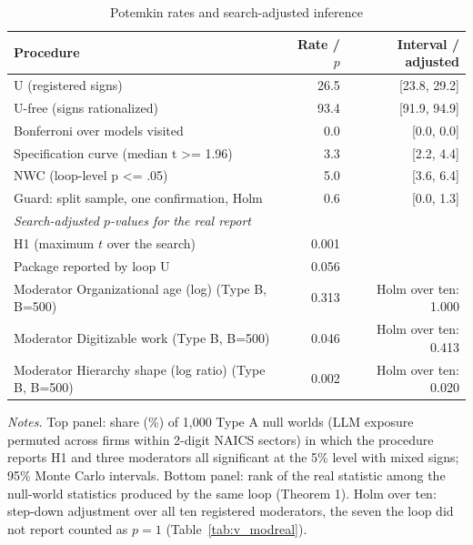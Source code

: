 \begin{table}[!htbp]\centering\footnotesize
\caption{Potemkin rates and search-adjusted inference}\label{tab:procedures}
\begin{tabular}{lrr}
\toprule
Procedure & Rate / $p$ & Interval / adjusted \\
\midrule
U (registered signs) & 26.5 & [23.8, 29.2] \\
U-free (signs rationalized) & 93.4 & [91.9, 94.9] \\
Bonferroni over models visited & 0.0 & [0.0, 0.0] \\
Specification curve (median t >= 1.96) & 3.3 & [2.2, 4.4] \\
NWC (loop-level p <= .05) & 5.0 & [3.6, 6.4] \\
Guard: split sample, one confirmation, Holm & 0.6 & [0.0, 1.3] \\
\midrule \multicolumn{3}{l}{\textit{Search-adjusted $p$-values for the real report}} \\
H1 (maximum $t$ over the search) & 0.001 &  \\
Package reported by loop U & 0.056 &  \\
Moderator Organizational age (log) (Type B, B=500) & 0.313 & Holm over ten: 1.000 \\
Moderator Digitizable work (Type B, B=500) & 0.046 & Holm over ten: 0.413 \\
Moderator Hierarchy shape (log ratio) (Type B, B=500) & 0.002 & Holm over ten: 0.020 \\
\bottomrule
\end{tabular}
\begin{minipage}{0.95\linewidth}\vspace{2pt}\scriptsize\textit{Notes.} Top panel: share (\%) of 1,000 Type A null worlds (LLM exposure permuted across firms within 2-digit NAICS sectors) in which the procedure reports H1 and three moderators all significant at the 5\% level with mixed signs; 95\% Monte Carlo intervals. Bottom panel: rank of the real statistic among the null-world statistics produced by the same loop (Theorem 1). Holm over ten: step-down adjustment over all ten registered moderators, the seven the loop did not report counted as $p=1$ (Table~\ref{tab:v_modreal}).\end{minipage}
\end{table}